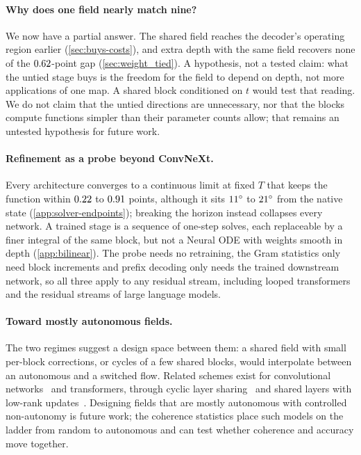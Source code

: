 \paragraph{Why does one field nearly match nine?}
We now have a partial answer.
The shared field reaches the decoder's operating region earlier
(\cref{sec:buys-costs}), and extra depth with the same field recovers none of the
$0.62$-point gap (\cref{sec:weight_tied}).
A hypothesis, not a tested claim: what the untied stage buys is the freedom for the
field to depend on depth, not more applications of one map.
A shared block conditioned on $t$ would test that reading.
We do not claim that the untied directions are unnecessary, nor that the blocks compute
functions simpler than their parameter counts allow; that remains an untested
hypothesis for future work.

\paragraph{Refinement as a probe beyond ConvNeXt.}
Every architecture converges to a continuous limit at fixed $T$ that keeps the function
within $0.22$ to $0.91$ points, although it sits
$11^\circ$ to $21^\circ$ from the native state
(\cref{app:solver-endpoints}); breaking the horizon instead collapses every network.
A trained stage is a sequence of one-step solves, each replaceable by a finer integral
of the same block, but not a Neural ODE with weights smooth in depth
(\cref{app:bilinear}).
The probe needs no retraining, the Gram statistics only need block increments and
prefix decoding only needs the trained downstream network, so all three apply to any
residual stream, including looped transformers~\citep{dehghani2019universal,giannou2023looped}
and the residual streams of large language models.

\paragraph{Toward mostly autonomous fields.}
The two regimes suggest a design space between them: a shared field with small
per-block corrections, or cycles of a few shared blocks, would interpolate between an
autonomous and a switched flow.
Related schemes exist for convolutional networks~\citep{savarese2019learning} and
transformers, through cyclic layer sharing~\citep{takase2021lessons} and shared layers
with low-rank updates~\citep{bae2024relaxed}.
Designing fields that are mostly autonomous with controlled non-autonomy is future
work; the coherence statistics place such models on the ladder from random to
autonomous and can test whether coherence and accuracy move together.

